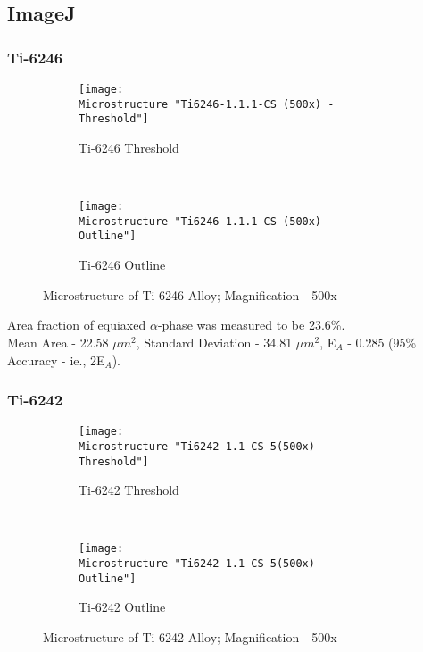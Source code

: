 \subsection{ImageJ}

\subsubsection{Ti-6246}
\begin{figure}[H]
    \centering
    \begin{subfigure}{0.49\textwidth}
        \texttt{[image: \\Microstructure "Ti6246-1.1.1-CS (500x) - Threshold"]}
        \caption{Ti-6246 Threshold}
        \label{fig:Ti-6246 Threshold}
    \end{subfigure}
    ~
    \begin{subfigure}{0.49\textwidth}
        \texttt{[image: \\Microstructure "Ti6246-1.1.1-CS (500x) - Outline"]}
        \caption{Ti-6246 Outline}
        \label{fig:Ti-6246 Outline}
    \end{subfigure}
  
    \caption{Microstructure of Ti-6246 Alloy; Magnification - 500x}
    \label{fig:As-Received-SEM}
\end{figure}

Area fraction of equiaxed $\alpha$-phase was measured to be 23.6\%.
\\
Mean Area - 22.58 $\mu m^{2}$, Standard Deviation - 34.81 $\mu m^{2}$, E$_{A}$ - 0.285 (95\% Accuracy - ie., 2E$_{A}$). 

\subsubsection{Ti-6242}
\begin{figure}[H]
    \centering
    \begin{subfigure}{0.49\textwidth}
        \texttt{[image: \\Microstructure "Ti6242-1.1-CS-5(500x) - Threshold"]}
        \caption{Ti-6242 Threshold}
        \label{fig:Ti-6242 Threshold}
    \end{subfigure}
    ~
    \begin{subfigure}{0.49\textwidth}
        \texttt{[image: \\Microstructure "Ti6242-1.1-CS-5(500x) - Outline"]}
        \caption{Ti-6242 Outline}
        \label{fig:Ti-6242 Outline}
    \end{subfigure}
  
    \caption{Microstructure of Ti-6242 Alloy; Magnification - 500x}
    \label{fig:As-Received}
\end{figure}


